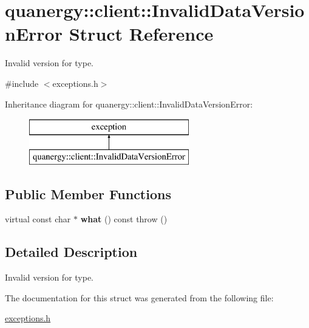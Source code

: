 \hypertarget{structquanergy_1_1client_1_1InvalidDataVersionError}{\section{quanergy\-:\-:client\-:\-:Invalid\-Data\-Version\-Error Struct Reference}
\label{structquanergy_1_1client_1_1InvalidDataVersionError}
}


Invalid version for type.  




{\ttfamily \#include $<$exceptions.\-h$>$}

Inheritance diagram for quanergy\-:\-:client\-:\-:Invalid\-Data\-Version\-Error\-:\begin{figure}[H]
\begin{center}
\leavevmode
\includegraphics[height=2.000000cm]{structquanergy_1_1client_1_1InvalidDataVersionError}
\end{center}
\end{figure}
\subsection*{Public Member Functions}
\begin{DoxyCompactItemize}
\item 
\hypertarget{structquanergy_1_1client_1_1InvalidDataVersionError_a51a26ca8d5ff1fccf68976886602646a}{virtual const char $\ast$ {\bfseries what} () const   throw ()}\label{structquanergy_1_1client_1_1InvalidDataVersionError_a51a26ca8d5ff1fccf68976886602646a}

\end{DoxyCompactItemize}


\subsection{Detailed Description}
Invalid version for type. 

The documentation for this struct was generated from the following file\-:\begin{DoxyCompactItemize}
\item 
\hyperlink{exceptions_8h}{exceptions.\-h}\end{DoxyCompactItemize}

